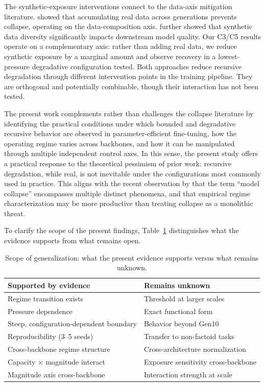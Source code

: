 \documentclass[a4paper,fleqn]{cas-dc}
\newif\ifshowchanges
\newcommand{\rev}[1]{\ifshowchanges{\color{blue}#1}\else{#1}\fi}
\renewcommand{\arraystretch}{1.8}
\begin{document}
The synthetic-exposure interventions connect to the data-axis mitigation
literature. \citet{gerstgrasser2024} showed that accumulating real data across
generations prevents collapse, operating on the data-composition axis.
\citet{wang2024diversity} further showed that synthetic data diversity
significantly impacts downstream model quality. Our
C3/C5 results operate on a complementary axis: rather than adding real data, we
reduce synthetic exposure by a marginal amount and observe recovery in a
\rev{lowest-pressure degradative configuration tested}. Both approaches reduce recursive degradation through
different intervention points in the training pipeline. They are orthogonal and
potentially combinable, though their interaction has not been tested.

The present work complements rather than challenges the collapse literature by
identifying the practical conditions under which bounded and degradative
recursive behavior are observed in parameter-efficient fine-tuning, how the
operating regime varies across backbones, and how it can be manipulated through
multiple independent control axes. In this sense, the present study offers a
practical response to the theoretical pessimism of prior work: recursive
degradation, while real, is not inevitable under the configurations most
commonly used in practice. This aligns with the recent observation by
\citet{schaeffer2025position} that the term ``model collapse'' encompasses
multiple distinct phenomena, and that empirical regime characterization may be
more productive than treating collapse as a monolithic threat.

To clarify the scope of the present findings, Table~\ref{tab:generalization}
distinguishes what the evidence supports from what remains open.

\begin{table}[htbp]
\caption{Scope of generalization: what the present evidence supports versus
what remains unknown.}\label{tab:generalization}
\footnotesize
\renewcommand{\arraystretch}{1.4}
\begin{tabular}{@{}p{3.6cm}p{3.6cm}@{}}
\toprule
\textbf{Supported by evidence} & \textbf{Remains unknown} \\
\midrule
Regime transition exists & Threshold at larger scales \\
\addlinespace
Pressure dependence & Exact functional form \\
\addlinespace
Steep, configuration-dependent boundary & Behavior beyond Gen10 \\
\addlinespace
Reproducibility (3--5 seeds) & Transfer to non-factoid tasks \\
\addlinespace
Cross-backbone regime structure & Cross-architecture normalization \\
\addlinespace
Capacity $\times$ magnitude interact & Exposure sensitivity cross-backbone \\
\addlinespace
Magnitude axis cross-backbone & Interaction strength at scale \\
\bottomrule
\end{tabular}
\end{table}
\end{document}
